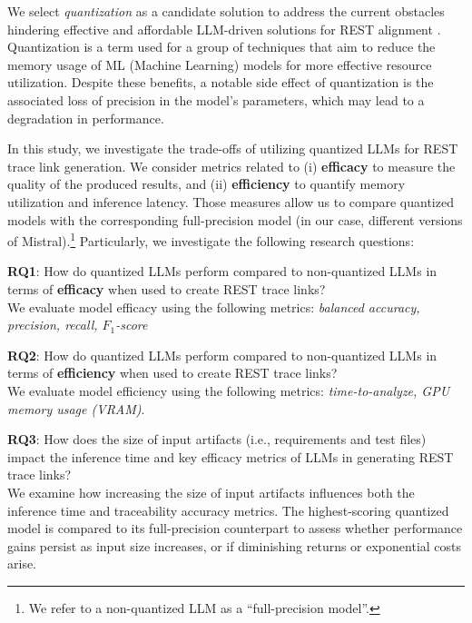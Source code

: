 \documentclass[conference]{IEEEtran}
\begin{document}
We select \textit{quantization} as a candidate solution to address the current obstacles hindering effective and affordable LLM-driven solutions for REST alignment \cite{bai2024beyond}. Quantization is a term used for a group of techniques that aim to reduce the memory usage of ML (Machine Learning) models for more effective resource utilization. Despite these benefits, a notable side effect of quantization is the associated loss of precision in the model's parameters, which may lead to a degradation in performance.

In this study, we investigate the trade-offs of utilizing quantized LLMs for REST trace link generation. We consider metrics related to (i) \textbf{efficacy} to measure the quality of the produced results, and (ii) \textbf{efficiency} to quantify memory utilization and inference latency. Those measures allow us to compare quantized models with the corresponding full-precision model (in our case, different versions of Mistral).\footnote{We refer to a non-quantized LLM as a ``full-precision model''.} Particularly, we investigate the following research questions:

\begin{RQBox}
    \textbf{RQ1}: How do quantized LLMs perform compared to non-quantized LLMs
    in terms of \textbf{efficacy} when used to create REST trace links?\\[0.5em]
    We evaluate model efficacy using the following metrics: \textit{balanced accuracy, precision, recall, $F_1$-score}
\end{RQBox}

\begin{RQBox}
    \textbf{RQ2}: How do quantized LLMs perform compared to non-quantized LLMs in
    terms of \textbf{efficiency} when used to create REST trace links? \\[0.5em]
    We evaluate model efficiency using the following metrics: \textit{time-to-analyze, GPU memory usage (VRAM)}.
\end{RQBox}

\begin{RQBox}
    \textbf{RQ3}: How does the size of input artifacts (i.e., requirements and test files) impact the inference time and key efficacy metrics of LLMs in generating REST trace links?\\[0.5em]
    We examine how increasing the size of input artifacts influences both the inference time and traceability accuracy metrics. The highest-scoring quantized model is compared to its full-precision counterpart to assess whether performance gains persist as input size increases, or if diminishing returns or exponential costs arise.
\end{RQBox}
\end{document}
